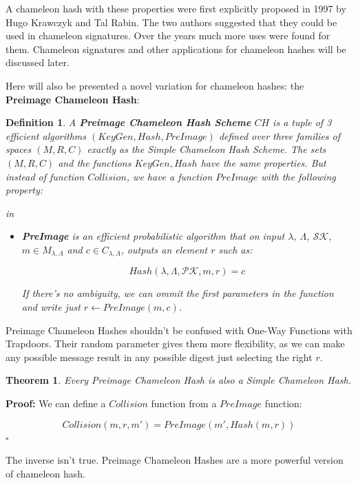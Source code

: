 \documentclass[a4paper]{article}
\newtheorem{definicao}{Definition}
\newtheorem{theorem}{Theorem}
\newcommand*{\qed}{\hfill\ensuremath{\square}}
\begin{document}
 A chameleon hash with these properties were first explicitly 
 proposed in 1997 by Hugo Krawczyk and Tal Rabin. The two authors 
 suggested that they could be used in chameleon signatures. Over the
 years much more uses were found for them. Chameleon signatures
 and other applications for chameleon hashes will be discussed later.
 
 Here will also be presented a novel variation for chameleon hashes:
 the \textbf{Preimage Chameleon Hash}:
 
 \begin{definicao}
 A \textbf{Preimage Chameleon Hash Scheme} $CH$ is a tuple of 3
 efficient algorithms $(KeyGen, Hash, PreImage)$ defined over
 three families of spaces $(M, R, C)$ exactly as the Simple 
 Chameleon Hash Scheme. The sets $(M, R, C)$ and the functions
 $KeyGen, Hash$ have the same properties. But instead of function
 $Collision$, we have a function $PreImage$ with the following property:
 
 in\begin{itemize}
 \item\textbf{PreImage} is an efficient probabilistic algorithm
 that on input $\lambda$, $\Lambda$, $\mathcal{SK}$,
 $m \in M_{\lambda,\Lambda}$ and $c \in C_{\lambda,\Lambda}$,
 outputs an element $r$ such as:
 
 $$
 Hash(\lambda, \Lambda, \mathcal{PK}, m, r)= c
 $$
 
 If there's no ambiguity, we can ommit the first parameters in the
 function and write just $r \leftarrow PreImage(m, c)$.
 \end{itemize}
 \end{definicao}
 
 Preimage Chameleon Hashes shouldn't be confused with One-Way Functions
 with Trapdoors. Their random parameter gives them more flexibility,
 as we can make any possible message result in any possible digest
 just selecting the right $r$.
 
 \begin{theorem}
 Every Preimage Chameleon Hash is also a Simple Chameleon Hash.
 \end{theorem}
 
 \textbf{Proof: }We can define a $Collision$ function from a
 $PreImage$ function:
 
 $$
 Collision(m, r, m') = PreImage(m', Hash(m, r))
 $$\qed
 
 The inverse isn't true. Preimage Chameleon Hashes are a more powerful
 version of chameleon hash.
 
\end{document}
